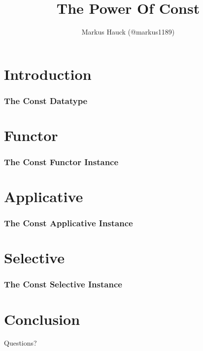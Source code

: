 \documentclass[aspectratio=169]{beamer}
\title{The Power Of Const}
\author{Markus Hauck (@markus1189)}
\begin{document}
\begin{frame}
  \titlepage{}
\end{frame}

\section{Introduction}\label{sec:introduction}

\begin{frame}
  \frametitle{The Const Datatype}
\end{frame}

\section{Functor}

\begin{frame}
  \frametitle{The Const Functor Instance}
\end{frame}

\section{Applicative}

\begin{frame}
  \frametitle{The Const Applicative Instance}
\end{frame}

\section{Selective}

\begin{frame}
  \frametitle{The Const Selective Instance}
\end{frame}

\section{Conclusion}

\begin{frame}
  \Huge{}
  Questions?
\end{frame}
\end{document}
